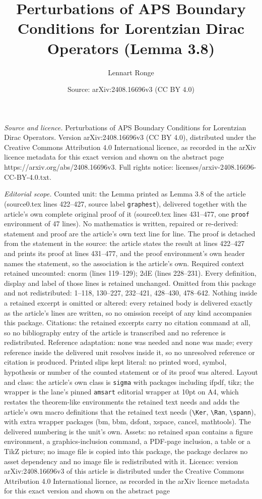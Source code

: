 \documentclass[10pt,a4paper]{amsart}
\title[Perturbations of APS Boundary Conditions for Lorentzian Dira]{Perturbations of APS Boundary Conditions for Lorentzian Dirac Operators (Lemma 3.8)}
\author{Lennart Ronge}
\date{Source: arXiv:2408.16696v3 (CC BY 4.0)}
\begin{document}
\maketitle

\noindent\emph{Source and licence.} Perturbations of APS Boundary Conditions for Lorentzian Dirac Operators. Version arXiv:2408.16696v3 (CC BY 4.0), distributed under the Creative Commons Attribution 4.0 International licence, as recorded in the arXiv licence metadata for this exact version and shown on the abstract page https://arxiv.org/abs/2408.16696v3. Full rights notice: licenses/arxiv-2408.16696-CC-BY-4.0.txt.\par\smallskip

\noindent\textit{Editorial scope.} Counted unit: the Lemma printed as Lemma 3.8 of the article (source0.tex lines 422--427, source label \texttt{graphest}), delivered together with the article's own complete original proof of it (source0.tex lines 431--477, one \texttt{proof} environment of 47 lines). No mathematics is written, repaired or re-derived: statement and proof are the article's own text line for line. The proof is detached from the statement in the source: the article states the result at lines 422--427 and prints its proof at lines 431--477, and the proof environment's own header names the statement, so the association is the article's own. Required context retained uncounted: cnorm (lines 119--129); 2dE (lines 228--231). Every definition, display and label of those lines is retained unchanged. Omitted from this package and not redistributed: 1--118, 130--227, 232--421, 428--430, 478--642. Nothing inside a retained excerpt is omitted or altered: every retained body is delivered exactly as the article's lines are written, so no omission receipt of any kind accompanies this package. Citations: the retained excerpts carry no citation command at all, so no bibliography entry of the article is transcribed and no reference is redistributed. Reference adaptation: none was needed and none was made; every reference inside the delivered unit resolves inside it, so no unresolved reference or citation is produced. Printed slips kept literal: no printed word, symbol, hypothesis or number of the counted statement or of its proof was altered. Layout and class: the article's own class is \texttt{sigma} with packages including ifpdf, tikz; the wrapper is the lane's pinned \texttt{amsart} editorial wrapper at 10pt on A4, which restates the theorem-like environments the retained text needs and adds the article's own macro definitions that the retained text needs (\texttt{\textbackslash Ker}, \texttt{\textbackslash Ran}, \texttt{\textbackslash spann}), with extra wrapper packages (bm, bbm, dsfont, xspace, cancel, mathtools). The delivered numbering is the unit's own. Assets: no retained span contains a figure environment, a graphics-inclusion command, a PDF-page inclusion, a table or a TikZ picture; no image file is copied into this package, the package declares no asset dependency and no image file is redistributed with it. Licence: version arXiv:2408.16696v3 of this article is distributed under the Creative Commons Attribution 4.0 International licence, as recorded in the arXiv licence metadata for this exact version and shown on the abstract page 
\end{document}
